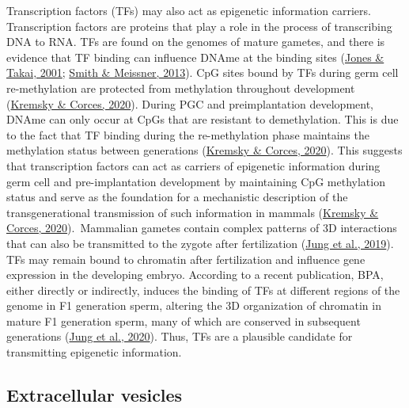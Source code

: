 \documentclass[12pt,twoside]{reedthesis}
\begin{document}
Transcription factors (TFs) may also act as epigenetic information
carriers. Transcription factors are proteins that play a role in the
process of transcribing DNA to RNA. TFs are found on the genomes of
mature gametes, and there is evidence that TF binding can influence
DNAme at the binding sites (\protect\hyperlink{ref-jones2001}{Jones \& Takai, 2001}; \protect\hyperlink{ref-smith2013}{Smith \& Meissner, 2013}). CpG sites bound by
TFs during germ cell re-methylation are protected from methylation
throughout development (\protect\hyperlink{ref-kremsky2020}{Kremsky \& Corces, 2020}). During PGC and preimplantation
development, DNAme can only occur at CpGs that are resistant to
demethylation. This is due to the fact that TF binding during the
re-methylation phase maintains the methylation status between
generations (\protect\hyperlink{ref-kremsky2020}{Kremsky \& Corces, 2020}). This suggests that transcription factors can
act as carriers of epigenetic information during germ cell and
pre-implantation development by maintaining CpG methylation status and
serve as the foundation for a mechanistic description of the
transgenerational transmission of such information in mammals
(\protect\hyperlink{ref-kremsky2020}{Kremsky \& Corces, 2020}).~Mammalian gametes contain complex patterns of 3D
interactions that can also be transmitted to the zygote after
fertilization (\protect\hyperlink{ref-jung2019}{Jung et al., 2019}). TFs may remain bound to chromatin after
fertilization and influence gene expression in the developing embryo.
According to a recent publication, BPA, either directly or indirectly,
induces the binding of TFs at different regions of the genome in F1
generation sperm, altering the 3D organization of chromatin in mature F1
generation sperm, many of which are conserved in subsequent generations
(\protect\hyperlink{ref-jung2020}{Jung et al., 2020}). Thus, TFs are a plausible candidate for transmitting
epigenetic information.

\hypertarget{extracellular-vesicles}{%
\subsection*{Extracellular vesicles}\label{extracellular-vesicles}}
\end{document}
